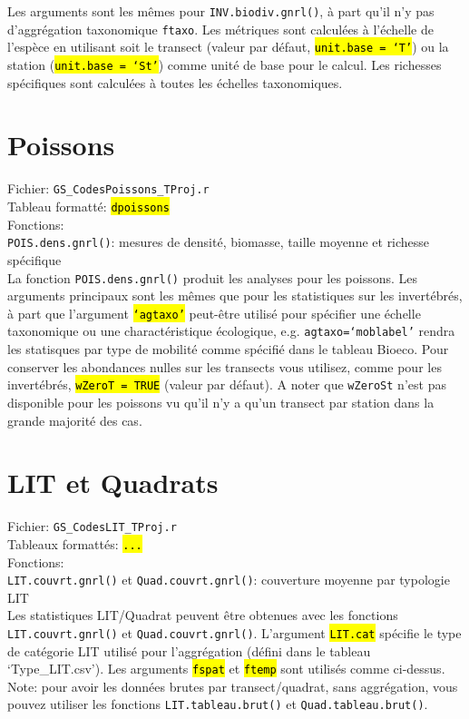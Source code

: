 \documentclass{article}
\begin{document}
Les arguments sont les mêmes pour \texttt{INV.biodiv.gnrl()}, à part qu'il n'y
pas d'aggrégation taxonomique \texttt{ftaxo}. Les métriques sont calculées à
l'échelle de l'espèce en utilisant soit le transect (valeur par
défaut, \hl{\texttt{unit.base = `T'}}) ou la station
(\hl{\texttt{unit.base = `St'}}) comme unité de
base pour le calcul. Les richesses spécifiques sont calculées à toutes
les échelles taxonomiques.

\section{Poissons}
Fichier: \texttt{GS\_CodesPoissons\_TProj.r}\\
Tableau formatté: \hl{\texttt{dpoissons}}\\
Fonctions:\\
\texttt{POIS.dens.gnrl()}: mesures de densité, biomasse, taille
moyenne et richesse spécifique\\

La fonction \texttt{POIS.dens.gnrl()} produit les analyses pour
les poissons. Les arguments principaux sont les mêmes que pour les
statistiques sur
les invertébrés, à part que l'argument \hl{\texttt{`agtaxo'}} peut-être utilisé
pour spécifier une échelle taxonomique ou une charactéristique
écologique, e.g. \texttt{agtaxo=`moblabel'} rendra les statisques par
type de mobilité comme spécifié dans le tableau Bioeco. Pour conserver
les abondances nulles sur les transects vous utilisez, comme pour les
invertébrés, \hl{\texttt{wZeroT = TRUE}} (valeur par
défaut). A noter que \texttt{wZeroSt} n'est pas disponible pour les
poissons vu qu'il n'y a qu'un transect par station dans la grande majorité
des cas.

\section{LIT et Quadrats}
Fichier: \texttt{GS\_CodesLIT\_TProj.r}\\
Tableaux formattés: \hl{\texttt{...}}\\
Fonctions:\\
\texttt{LIT.couvrt.gnrl()} et \texttt{Quad.couvrt.gnrl()}: couverture
moyenne par typologie LIT\\

Les statistiques LIT/Quadrat peuvent être obtenues avec les fonctions
\texttt{LIT.couvrt.gnrl()} et \texttt{Quad.couvrt.gnrl()}. L'argument
\hl{\texttt{LIT.cat}} spécifie
le type de catégorie LIT utilisé pour l'aggrégation (défini dans le
tableau `Type\_LIT.csv'). Les arguments \hl{\texttt{fspat}} et
\hl{\texttt{ftemp}} sont utilisés comme ci-dessus. Note: pour avoir les
données brutes par transect/quadrat, sans aggrégation, vous pouvez
utiliser les fonctions \texttt{LIT.tableau.brut()} et
\texttt{Quad.tableau.brut()}.
\end{document}
